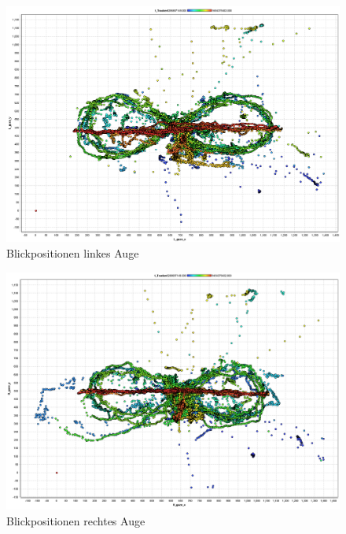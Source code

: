 \begin{figure}[H]
	\noindent \begin{centering}
		\includegraphics[width=15cm]{pics/BlickeLinkesAuge.png}
		\par\end{centering}
	\caption{\label{fig:BlickeLinkesAuge}Blickpositionen linkes Auge \cite{BilderExplorativeDatenanalyseBoersch}}
\end{figure}

\begin{figure}[H]
	\noindent \begin{centering}
		\includegraphics[width=15cm]{pics/BlickeRechtesAuge.png}
		\par\end{centering}
	\caption{\label{fig:BlickeRechtesAuge}Blickpositionen rechtes Auge \cite{BilderExplorativeDatenanalyseBoersch}}
\end{figure}

